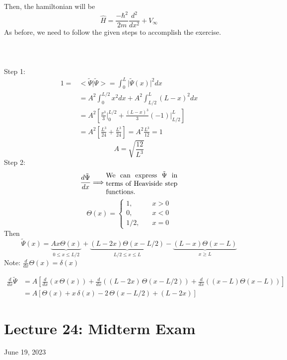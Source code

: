 \documentclass[12pt,fancychapters]{report}
\numberwithin{equation}{section}
\begin{document}
Then, the hamiltonian will be 
\[
  \hat{H} = \frac{-\hbar^2}{2m}\frac{d^2}{dx^2} + V_\infty 
\]
As before, we need to follow the given steps to accomplish the exercise.\\
\\
\\
\\
Step 1: 
\begin{align*}
  1 =& \big<\tilde{\Psi}\big|\tilde{\Psi} \big> = \int_{0}^{L}\big|\tilde{\Psi}(x)\big|^2dx\\
  &= A^2 \int_{0}^{L/2} x^2 dx  + A^2\int_{L/2}^{L} (L-x)^2dx\\
  &= A^2 \left[\frac{x^3}{3}\bigg|_{0}^{L/2} + \frac{(L-x)^3}{3}(-1)\bigg|_{L/2}^{L}\right]\\
  &= A^2 \left[\frac{L^3}{24}+\frac{L^3}{24} \right] = A^2 \frac{L^3}{12} = 1
\end{align*}
\[
  \boxed{A = \sqrt{\frac{12}{L^3}}}
\]
Step 2: 
\[
  \frac{d\tilde{\Psi}}{dx} \Longrightarrow \parbox{0.3\textwidth}{We can express $\tilde{\Psi}$
  in terms of Heaviside step functions.}
\]
\[
  \Theta (x) = 
  \begin{cases}
    1, & \quad x>0\\
    0, & \quad x < 0\\
    1/2, & \quad x = 0
  \end{cases}
\]
Then
\[
  \tilde{\Psi}(x) = \underbrace{Ax\Theta(x)}_{0\leq x\leq L/2} + 
  \underbrace{(L-2x)\Theta(x-L/2)}_{L/2\leq x\leq L} - 
  \underbrace{(L-x)\Theta(x-L)}_{x\geq L}
\]
Note: $\frac{d}{dx}\Theta(x) = \delta(x)$

\begin{align*}
  \frac{d}{dx}\tilde{\Psi} &= A\left[\frac{d}{dx}(x\,\Theta(x)) + \frac{d}{dx}((L-2x)\,
  \Theta(x-L/2)) + \frac{d}{dx}((x-L)\Theta(x-L))\right]\\
                           &= A\left[\Theta(x)+x\,\delta(x) - 2\,\Theta(x-L/2)+
                           (L-2x)\right]
\end{align*}

\clearpage
\newpage
\section{Lecture 24: Midterm Exam}
June 19, 2023
\end{document}
